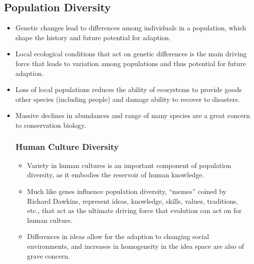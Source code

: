 \documentclass{inVerba-notes}
\begin{document}
\begin{itemize}
    \subsection{Population Diversity}\label{Population-Level Diversity}
    \begin{itemize}
        \item Genetic changes lead to differences among individuals in a population, which shape the history and future potential for adaption.
        \item Local ecological conditions that act on genetic differences is the main driving force that leads to variation among populations and thus potential for future adaption.
        \item Loss of local populations reduces the ability of ecosystems to provide goods other species (including people) and damage ability to recover to disasters. 
        \item Massive declines in abundances and range of many species are a great concern to conservation biology.
    \subsubsection{Human Culture Diversity}\label{Human Culture Diversity}
        \begin{itemize}
            \item Variety in human cultures is an important component of population diversity, as it embodies the reservoir of human knowledge.
            \item Much like genes influence population diversity, ``memes'' coined by Richard Dawkins, represent ideas, knowledge, skills, values, traditions, etc., that act as the ultimate driving force that evolution can act on for human culture.
            \item Differences in ideas allow for the adaption to changing social environments, and increases in homogeneity in the idea space are also of grave concern.
        \end{itemize}
    \end{itemize}
    

\end{itemize}
\end{document}

